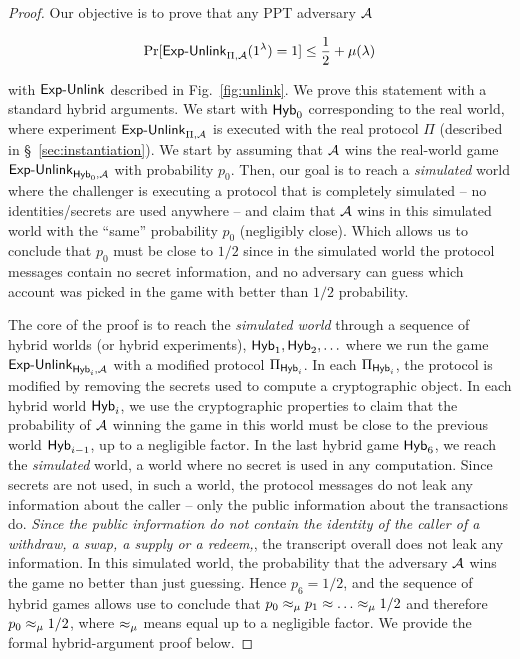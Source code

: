 \begin{proof}

Our objective is to prove that any PPT adversary $\mathcal{A}$

$$\Pr[\mathsf{Exp\text{-}Unlink}_{\Pi,\mathcal{A}}(1^{\lambda}) = 1] \le \frac{1}{2} + \mu(\lambda)$$

with $\mathsf{Exp\text{-}Unlink}$ described in Fig.~\ref{fig:unlink}.
\newcommand{\last}{6}
We prove this statement with a standard  hybrid arguments.
We start with $\mathsf{Hyb}_0$ corresponding to the  real world, where
experiment  $\mathsf{Exp\text{-}Unlink}_{\Pi,\mathcal{A}}$ is executed with the real protocol $\Pi$ (described in \S~\ref{sec:instantiation}). We start by assuming that $\mathcal{A}$ wins the real-world game $\mathsf{Exp\text{-}Unlink}_{\mathsf{Hyb}_0,\mathcal{A}}$ with probability $p_{0}$.
Then, our goal is to reach a \emph{simulated} world where the challenger is executing a protocol that is completely simulated -- no identities/secrets are used anywhere -- and claim that $\mathcal{A}$ wins in
this simulated world with the ``same'' probability  $p_{0}$ (negligibly close). Which allows us to conclude that $p_{0}$ must be close to $1/2$ since in the simulated world the protocol messages contain no secret information, and no adversary can guess which account was picked in the game with better than $1/2$ probability.

The core of the proof is to reach the \emph{simulated world} through a sequence of hybrid worlds (or hybrid experiments),
 $\mathsf{Hyb}_1, \mathsf{Hyb}_2, \ldots$  where we run the game
 $\mathsf{Exp\text{-}Unlink}_{\mathsf{Hyb}_i,\mathcal{A}}$ with a modified protocol $\Pi_{\mathsf{Hyb}_i}$.
 In  each $\Pi_{\mathsf{Hyb}_i}$, the protocol is modified by removing the secrets used to compute a  cryptographic object. In each hybrid world $\mathsf{Hyb}_i$,
we use the cryptographic properties to claim that the probability  of $\mathcal{A}$ winning the game in this world  must be  close to  the previous world $\mathsf{Hyb}_{i-1}$,  up to a negligible factor.
In the last hybrid game $\hybrid_{\last}$, we reach the \emph{simulated} world, a world where  no secret is used in any computation. Since secrets are not used, in such a world, the protocol messages do not leak any information about the caller -- only the public information about the transactions do.
\emph{Since the public information do not contain the identity of the caller of a withdraw, a swap, a supply or a  redeem,}, the transcript overall does not leak any information.
In this simulated world, the probability that the adversary $\mathcal{A}$ wins the game no better than just guessing.
Hence $p_{\last}= 1/2$, and the sequence of hybrid games allows use to conclude that $p_0\approx_{\mu} p_1 \approx\ldots \approx_{\mu} 1/2$ and therefore $p_0 \approx_{\mu} 1/2$, where $\approx_{\mu}$ means equal up to a negligible factor.
We provide the formal hybrid-argument proof below.



\end{proof}
